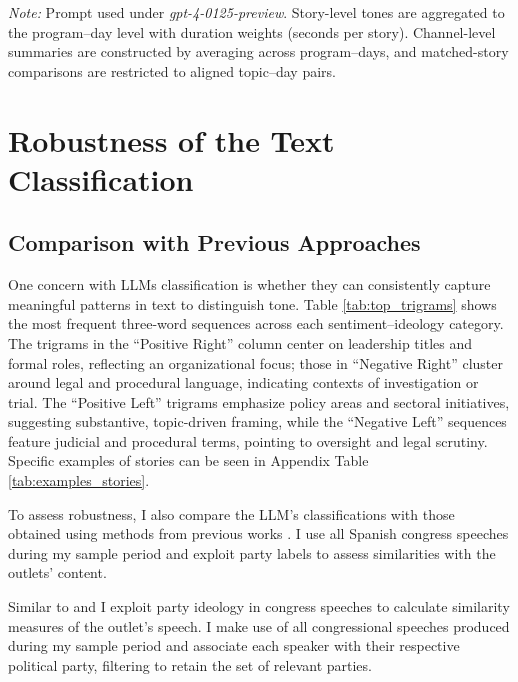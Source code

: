 \documentclass[12pt]{article}
\begin{document}
\noindent\textit{Note:} Prompt used under \textit{gpt-4-0125-preview}. Story-level tones are aggregated to the program–day level with duration weights (seconds per story). Channel-level summaries are constructed by averaging across program–days, and matched-story comparisons are restricted to aligned topic–day pairs.



\newpage




\section{Robustness of the Text Classification}

\label{sec:robustness}







\subsection{Comparison with Previous Approaches}


One concern with LLMs classification is whether they can consistently capture meaningful patterns in text to distinguish tone. Table \ref{tab:top_trigrams} shows the most frequent three-word sequences across each sentiment–ideology category. The trigrams in the “Positive Right” column center on leadership titles and formal roles, reflecting an organizational focus; those in “Negative Right” cluster around legal and procedural language, indicating contexts of investigation or trial. The “Positive Left” trigrams emphasize policy areas and sectoral initiatives, suggesting substantive, topic-driven framing, while the “Negative Left” sequences feature judicial and procedural terms, pointing to oversight and legal scrutiny. Specific examples of stories can be seen in Appendix Table \ref{tab:examples_stories}.


To assess robustness, I also compare the LLM’s classifications with those obtained using methods from previous works \citep{gentzkow2010media,laver2003extracting}. I use all Spanish congress speeches during my sample period and exploit party labels to assess similarities with the outlets’ content. 


Similar to \cite{gentzkow2010media} and \cite{laver2003extracting} I exploit party ideology in congress speeches to calculate similarity measures of the outlet's speech. I make use of all congressional speeches produced during my sample period and associate each speaker with their respective political party, filtering to retain the set of relevant parties.
\end{document}
